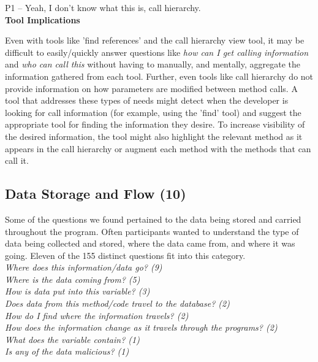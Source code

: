\documentclass[conference]{IEEEtran}
\begin{document}
P1 -- Yeah, I don't know what this is, call hierarchy.
\\

\noindent\textbf{Tool Implications}

Even with tools like 'find references' and the call hierarchy view tool, it may be difficult to easily/quickly answer questions like \emph{how can I get calling information} and \emph{who can call this} without having to manually, and mentally, aggregate the information gathered from each tool. 
Further, even tools like call hierarchy do not provide information on how parameters are modified between method calls. 
A tool that addresses these types of needs might detect when the developer is looking for call information (for example, using the 'find' tool) and suggest the appropriate tool for finding the information they desire. 
To increase visibility of the desired information, the tool might also highlight the relevant method as it appears in the call hierarchy or augment each method with the methods that can call it.



\noindent\subsection{\textbf{Data Storage and Flow (10)}}\label{dsf}

Some of the questions we found pertained to the data being stored and carried throughout the program. 
Often participants wanted to understand  the type of data being collected and stored, where the data came from, and where it was going. 
Eleven of the 155 distinct questions fit into this category.
\\

\noindent\emph{Where does this information/data go? (9)} \\
\emph{Where is the data coming from? (5)} \\
\emph{How is data put into this variable? (3)} \\
\emph{Does data from this method/code travel to the database? (2)} \\
\emph{How do I find where the information travels? (2)} \\
\emph{How does the information change as it travels through the programs? (2)} \\
\emph{What does the variable contain? (1)} \\
\emph{Is any of the data malicious? (1)} \\
\end{document}
